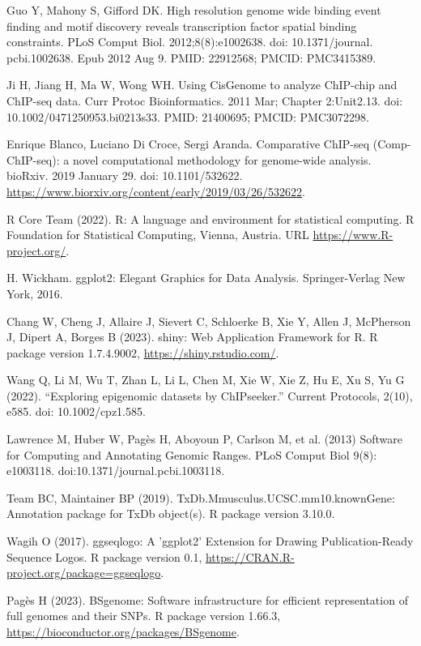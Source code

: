 \documentclass[12pt]{article}
\begin{document}
\begin{thebibliography}{99}
 Guo Y, Mahony S, Gifford DK. High resolution genome wide
binding event finding and motif discovery reveals transcription factor spatial
binding constraints. PLoS Comput Biol. 2012;8(8):e1002638. doi: 10.1371/journal.
pcbi.1002638. Epub 2012 Aug 9. PMID: 22912568; PMCID: PMC3415389.

 Ji H, Jiang H, Ma W, Wong WH. Using CisGenome to analyze
ChIP-chip and ChIP-seq data. Curr Protoc Bioinformatics. 2011 Mar;
Chapter 2:Unit2.13. doi: 10.1002/0471250953.bi0213s33. PMID: 21400695;
PMCID: PMC3072298.

 Enrique Blanco, Luciano Di Croce, Sergi Aranda. Comparative
ChIP-seq (Comp-ChIP-seq): a novel computational methodology for genome-wide
analysis. bioRxiv. 2019 January 29. doi: 10.1101/532622. \newline
\url{https://www.biorxiv.org/content/early/2019/03/26/532622}.

 R Core Team (2022). R: A language and environment for statistical
computing. R Foundation for Statistical Computing, Vienna, Austria. URL
\url{https://www.R-project.org/}.

 H. Wickham. ggplot2: Elegant Graphics for Data Analysis.
Springer-Verlag New York, 2016.

 Chang W, Cheng J, Allaire J, Sievert C, Schloerke B, Xie Y,
Allen J, McPherson J, Dipert A, Borges B (2023). shiny: Web Application
Framework for R. R package version 1.7.4.9002, \url{https://shiny.rstudio.com/}.

 Wang Q, Li M, Wu T, Zhan L, Li L, Chen M, Xie W, Xie Z,
Hu E, Xu S, Yu G (2022). “Exploring epigenomic datasets by ChIPseeker.”
Current Protocols, 2(10), e585. doi: 10.1002/cpz1.585.

 Lawrence M, Huber W, Pag\`es H, Aboyoun P, Carlson M,
et al. (2013) Software for Computing and Annotating Genomic Ranges. PLoS Comput
Biol 9(8): e1003118. doi:10.1371/journal.pcbi.1003118.

 Team BC, Maintainer BP (2019). 
TxDb.Mmusculus.UCSC.mm10.knownGene: Annotation package for TxDb object(s).
R package version 3.10.0.

 Wagih O (2017). ggseqlogo: A 'ggplot2' Extension for
Drawing Publication-Ready Sequence Logos. R package version 0.1, \newline
\url{https://CRAN.R-project.org/package=ggseqlogo}.

 Pagès H (2023). BSgenome: Software infrastructure for
efficient representation of full genomes and their SNPs. R package version
1.66.3, \newline
\url{https://bioconductor.org/packages/BSgenome}.


\end{thebibliography}
\end{document}

